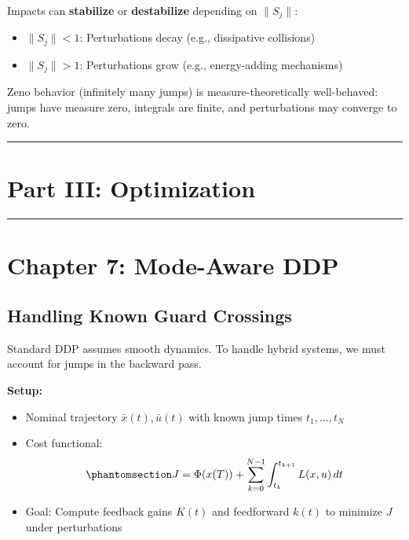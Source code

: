 \documentclass[
  letterpaper,
  DIV=11,
  numbers=noendperiod]{scrartcl}
\providecommand{\tightlist}{%
  \setlength{\itemsep}{0pt}\setlength{\parskip}{0pt}}\usepackage{longtable,booktabs,array}
\begin{document}
Impacts can \textbf{stabilize} or \textbf{destabilize} depending on
\(\|S_j\|\):

\begin{itemize}
\tightlist
\item
  \(\|S_j\| < 1\): Perturbations decay (e.g., dissipative collisions)
\item
  \(\|S_j\| > 1\): Perturbations grow (e.g., energy-adding mechanisms)
\end{itemize}

Zeno behavior (infinitely many jumps) is measure-theoretically
well-behaved: jumps have measure zero, integrals are finite, and
perturbations may converge to zero.

\begin{center}\rule{0.5\linewidth}{0.5pt}\end{center}

\section*{Part III: Optimization}\label{part-iii-optimization}

\begin{center}\rule{0.5\linewidth}{0.5pt}\end{center}

\section{Chapter 7: Mode-Aware DDP}\label{sec-mode-aware-ddp}

\subsection{Handling Known Guard
Crossings}\label{handling-known-guard-crossings}

Standard DDP assumes smooth dynamics. To handle hybrid systems, we must
account for jumps in the backward pass.

\textbf{Setup:}

\begin{itemize}
\tightlist
\item
  Nominal trajectory \(\bar{x}(t), \bar{u}(t)\) with known jump times
  \(t_1, \ldots, t_N\)
\item
  Cost functional:
  \begin{equation}\phantomsection\label{eq-hybrid-cost}{
  J = \Phi(x(T)) + \sum_{k=0}^{N-1} \int_{t_k}^{t_{k+1}} L(x, u) \, dt
  }\end{equation}
\item
  Goal: Compute feedback gains \(K(t)\) and feedforward \(k(t)\) to
  minimize \(J\) under perturbations
\end{itemize}
\end{document}
